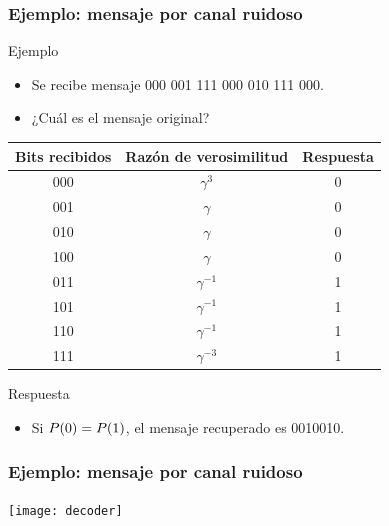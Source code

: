 \documentclass[table]{beamer}
\begin{document}
\begin{frame}
    \frametitle{Ejemplo: mensaje por canal ruidoso}
    \begin{block}{Ejemplo}
        \begin{itemize}
            \item Se recibe mensaje 000 001 111 000 010 111 000.
            \item ¿Cuál es el mensaje original?
        \end{itemize}
    \end{block}
    \begin{center}
        \begin{tabular}{ccc}
            Bits recibidos & Razón de verosimilitud & Respuesta \\
            \hline
            000 & $\gamma^{3}$ & 0 \\
            001 & $\gamma$ & 0 \\
            010 & $\gamma$ & 0 \\
            100 & $\gamma$ & 0 \\
            011 & $\gamma^{-1}$ & 1 \\
            101 & $\gamma^{-1}$ & 1 \\
            110 & $\gamma^{-1}$ & 1 \\
            111 & $\gamma^{-3}$ & 1 \\
        \end{tabular}
    \end{center}
    \begin{block}{Respuesta}
        \begin{itemize}
            \item Si $\prob{0} = \prob{1}$, el mensaje recuperado es 0010010.
        \end{itemize}
    \end{block}
\end{frame}

\begin{frame}
    \frametitle{Ejemplo: mensaje por canal ruidoso}
    \begin{center}
        \texttt{[image: decoder]}
    \end{center}
\end{frame}
\end{document}
